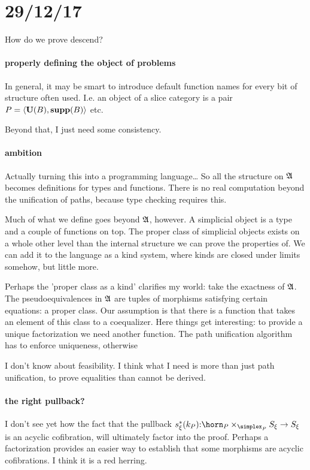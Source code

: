 \documentclass[csh.tex]{subfiles}
\begin{document}
\section{29/12/17}
How do we prove descend?


\paragraph{properly defining the object of problems}

In general, it may be smart to introduce default function names
for every bit of structure often used. I.e. an object of a slice category is a pair $P = \left\langle \mathbf{U}(B),\mathbf{supp}(B) \right\rangle$ etc.

Beyond that, I just need some consistency.


\paragraph{ambition}
Actually turning this into a programming language\dots
So all the structure on $\mathfrak A$ becomes definitions for types and functions. There is no real computation beyond the unification of paths, because type checking requires this.

Much of what we define goes beyond $\mathfrak A$, however. A simplicial object is a type and a couple of functions on top. The proper class of simplicial objects exists on a whole other level than the internal structure we can prove the properties of.
We can add it to the language as a kind system, where kinds are closed under limits somehow, but little more.

Perhaps the 'proper class as a kind' clarifies my world: take the exactness of $\mathfrak A$. The pseudoequivalences in $\mathfrak A$ are tuples of morphisms satisfying certain equations: a proper class. Our assumption is that there is a function that takes an element of this class to a coequalizer.
Here things get interesting: to provide a unique factorization we need another function. The path unification algorithm has to enforce uniqueness, otherwise 

I don't know about feasibility. I think what I need is more than just path unification, to prove equalities than cannot be derived.

\paragraph{the right pullback?}
I don't see yet how the fact that the pullback $s_\xi\ri(k_P)\of \horn_P\times_{\simplex_P}S_\xi \to S_\xi$ is an acyclic cofibration, will ultimately factor into the proof. Perhaps a factorization provides an easier way to establish that some morphisms are acyclic cofibrations.
I think it is a red herring.
\end{document}
